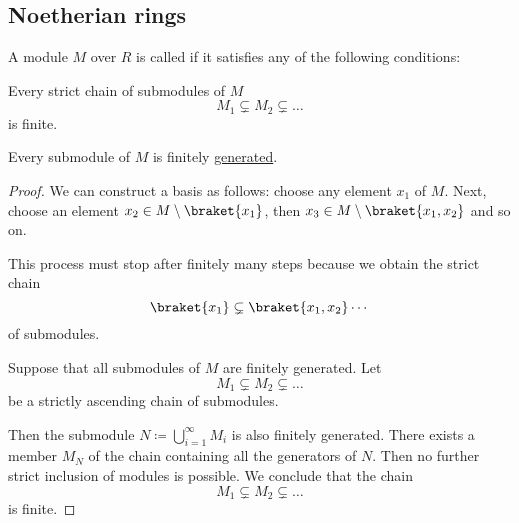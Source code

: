 \subsection{Noetherian rings}\label{subsec:noetherian_rings}

\begin{definition}\label{def:noetherian_module}
  A module \( M \) over \( R \) is called  if it satisfies any of the following conditions:
  \begin{thmenum}
     Every strict chain of submodules of \( M \)
    \begin{equation*}
      M_1 \subsetneq M_2 \subsetneq \ldots
    \end{equation*}
    is finite.

     Every submodule of \( M \) is finitely \hyperref[def:free_left_module]{generated}.
  \end{thmenum}
\end{definition}
\begin{proof}
   We can construct a basis as follows: choose any element \( x_1 \) of \( M \). Next, choose an element \( x_2 \in M \setminus \braket {x_1} \), then \( x_3 \in M \setminus \braket {x_1, x_2} \) and so on.

  This process must stop after finitely many steps because we obtain the strict chain
  \begin{equation*}
    \braket {x_1} \subsetneq \braket {x_1, x_2} \cdots
  \end{equation*}
  of submodules.

   Suppose that all submodules of \( M \) are finitely generated. Let
  \begin{equation*}
    M_1 \subsetneq M_2 \subsetneq \ldots
  \end{equation*}
  be a strictly ascending chain of submodules.

  Then the submodule \( N \coloneqq \bigcup_{i=1}^\infty M_i \) is also finitely generated. There exists a member \( M_N \) of the chain containing all the generators of \( N \). Then no further strict inclusion of modules is possible. We conclude that the chain
  \begin{equation*}
    M_1 \subsetneq M_2 \subsetneq \ldots
  \end{equation*}
  is finite.
\end{proof}

